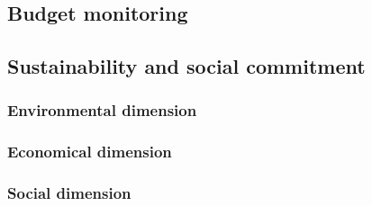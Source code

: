\subsection{Budget monitoring}

\subsection{Sustainability and social commitment}

\subsubsection{Environmental dimension}

\subsubsection{Economical dimension}

\subsubsection{Social dimension}


